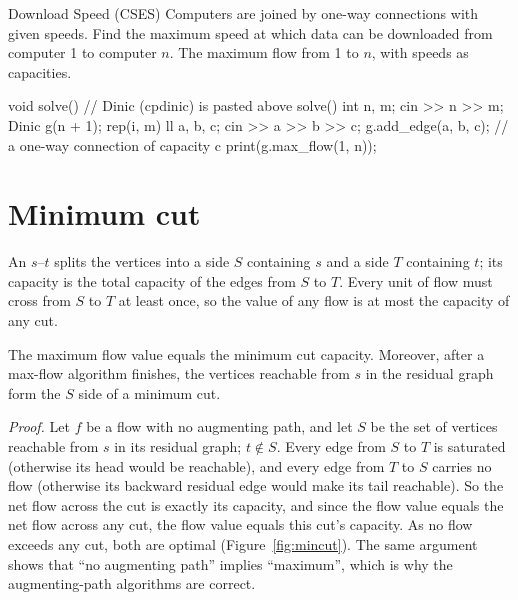 \begin{problem}{Download Speed (CSES)}
Computers are joined by one-way connections with given speeds. Find the maximum speed at which data can be downloaded from
computer 1 to computer $n$.
\solution The maximum flow from 1 to $n$, with speeds as capacities.
\end{problem}

\begin{code}
void solve() {  // Dinic (cpdinic) is pasted above solve()
    int n, m;
    cin >> n >> m;
    Dinic g(n + 1);
    rep(i, m) {
        ll a, b, c;
        cin >> a >> b >> c;
        g.add_edge(a, b, c);  // a one-way connection of capacity c
    }
    print(g.max_flow(1, n));
}
\end{code}


\section[Minimum cut]{Minimum cut \hfill \ioi}\label{sec:mincut}

An $s$--$t$  splits the vertices into a side $S$ containing $s$ and a side $T$ containing $t$; its capacity is the
total capacity of the edges from $S$ to $T$. Every unit of flow must cross from $S$ to $T$ at least once, so the value of any
flow is at most the capacity of any cut.

\begin{fact}
The maximum flow value equals the minimum cut capacity. Moreover, after a max-flow algorithm finishes, the vertices reachable
from $s$ in the residual graph form the $S$ side of a minimum cut.
\end{fact}

\emph{Proof.} Let $f$ be a flow with no augmenting path, and let $S$ be the set of vertices reachable from $s$ in its residual
graph; $t \notin S$. Every edge from $S$ to $T$ is saturated (otherwise its head would be reachable), and every edge from $T$ to
$S$ carries no flow (otherwise its backward residual edge would make its tail reachable). So the net flow across the cut is exactly
its capacity, and since the flow value equals the net flow across any cut, the flow value equals this cut's capacity. As no flow
exceeds any cut, both are optimal (Figure~\ref{fig:mincut}). The same argument shows that ``no augmenting path'' implies
``maximum'', which is why the augmenting-path algorithms are correct.


